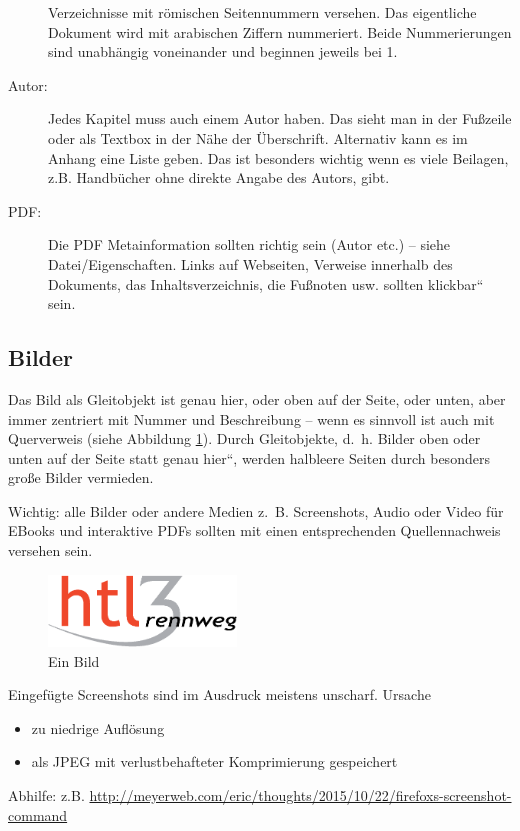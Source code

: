\begin{description}
Verzeichnisse mit römischen Seitennummern versehen. Das eigentliche
Dokument wird mit arabischen Ziffern nummeriert. Beide Nummerierungen
sind unabhängig voneinander und beginnen jeweils bei 1.
\item [{Autor:}] Jedes Kapitel muss auch einem Autor haben. Das sieht man
in der Fußzeile oder als Textbox in der Nähe der Überschrift. Alternativ
kann es im Anhang eine Liste geben. Das ist besonders wichtig wenn
es viele Beilagen, z.B. Handbücher ohne direkte Angabe des Autors,
gibt.
\item [{PDF:}] Die PDF Metainformation sollten richtig sein (Autor etc.)
-- siehe Datei/Eigenschaften. Links auf Webseiten, Verweise innerhalb
des Dokuments, das Inhaltsverzeichnis, die Fußnoten usw. sollten \quotedblbase klickbar``
sein.
\end{description}

\subsection{Bilder\label{sub:Bilder}}

Das Bild als Gleitobjekt ist genau hier, oder oben auf der Seite,
oder unten, aber immer zentriert mit Nummer und Beschreibung -- wenn
es sinnvoll ist auch mit Querverweis (siehe Abbildung \ref{Bild11}).
Durch Gleitobjekte, d.~h. Bilder oben oder unten auf der Seite statt
\quotedblbase genau hier``, werden halbleere Seiten durch besonders
große Bilder vermieden.

Wichtig: alle Bilder oder andere Medien z.~B. Screenshots, Audio
oder Video für EBooks und interaktive PDFs sollten mit einen entsprechenden
Quellennachweis versehen sein.

\begin{figure}[tbh]
\begin{centering}
\includegraphics[width=5cm]{HTL3RLogoRGB}
\par\end{centering}

\caption{Ein Bild}
\label{Bild11}
\end{figure}

Eingefügte Screenshots sind im Ausdruck meistens unscharf. Ursache
\begin{itemize}
\item zu niedrige Auflösung
\item als JPEG mit verlustbehafteter Komprimierung gespeichert
\end{itemize}
Abhilfe: z.B. \url{http://meyerweb.com/eric/thoughts/2015/10/22/firefoxs-screenshot-command}

